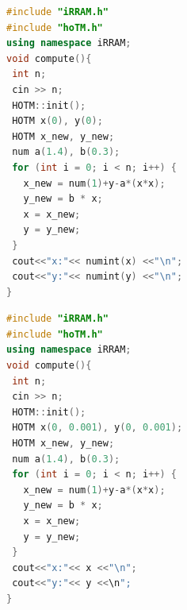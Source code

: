  
 \begin{minipage}{.5\textwidth}
    \begin{lstlisting}[language=C++, style=cpp, caption={[Implementierung der H\e non-Iteration in HOTM mit Intervallen,] \\Implementierung mit Punktintervallen },label=list:int]
#include "iRRAM.h"
#include "hoTM.h"
using namespace iRRAM;
void compute(){
 int n;
 cin >> n;
 HOTM::init();
 HOTM x(0), y(0);
 HOTM x_new, y_new;
 num a(1.4), b(0.3);
 for (int i = 0; i < n; i++) {
   x_new = num(1)+y-a*(x*x);
   y_new = b * x;
   x = x_new;
   y = y_new;
 }
 cout<<"x:"<< numint(x) <<"\n";
 cout<<"y:"<< numint(y) <<"\n";
}
\end{lstlisting}
 \end{minipage}
 \begin{minipage}{.5\textwidth}
    \begin{lstlisting}[language=C++,  style=cpp, caption={[Implementierung der H\e non-Iteration in HOTM mit Intervallen] \\Implementierung mit Intervallen }, label=list:point]  
#include "iRRAM.h"
#include "hoTM.h"
using namespace iRRAM;
void compute(){
 int n;
 cin >> n;
 HOTM::init();
 HOTM x(0, 0.001), y(0, 0.001);
 HOTM x_new, y_new;
 num a(1.4), b(0.3);
 for (int i = 0; i < n; i++) {
   x_new = num(1)+y-a*(x*x);
   y_new = b * x;
   x = x_new;
   y = y_new;
 }
 cout<<"x:"<< x <<"\n";
 cout<<"y:"<< y <<\n";
}
\end{lstlisting}
 \end{minipage}

 
 

